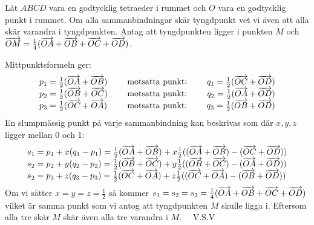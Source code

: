 \begin{task}{2.11}
	Låt $ABCD$ vara en godtycklig tetraeder i rummet och $O$ vara en godtycklig punkt i rummet. 
	Om alla sammanbindningar skär tyngdpunkt vet vi även att alla skär varandra i tyngdpunkten.
	Antag att tyngdpunkten ligger i punkten $M$ och $\overrightarrow{OM}=\frac{1}{4}(\overrightarrow{OA}+\overrightarrow{OB}+\overrightarrow{OC}+\overrightarrow{OD})$.

	Mittpunktsformeln ger:
	\[\begin{array}{lcr}
	p_1=\frac{1}{2}(\overrightarrow{OA}+\overrightarrow{OB}) & \text{~~~~motsatta punkt:~~~~} & q_1=\frac{1}{2}(\overrightarrow{OC}+\overrightarrow{OD}) \\
	p_2=\frac{1}{2}(\overrightarrow{OB}+\overrightarrow{OC}) & \text{~~~~motsatta punkt:~~~~} & q_2=\frac{1}{2}(\overrightarrow{OA}+\overrightarrow{OD}) \\
	p_3=\frac{1}{2}(\overrightarrow{OC}+\overrightarrow{OA}) & \text{~~~~motsatta punkt:~~~~} & q_3=\frac{1}{2}(\overrightarrow{OB}+\overrightarrow{OD})
	\end{array}\]
	En slumpmässig punkt på varje sammanbindning kan beskrivas som där $x,y,z$ ligger mellan 0 och 1:
	\[\begin{array}{l}
	s_1=p_1+x(q_1-p_1)=\frac{1}{2}(\overrightarrow{OA}+\overrightarrow{OB})+x\frac{1}{2}((\overrightarrow{OA}+\overrightarrow{OB})-(\overrightarrow{OC}+\overrightarrow{OD})) \\
	s_2=p_2+y(q_2-p_2)=\frac{1}{2}(\overrightarrow{OB}+\overrightarrow{OC})+y\frac{1}{2}((\overrightarrow{OB}+\overrightarrow{OC})-(\overrightarrow{OA}+\overrightarrow{OD})) \\
	s_2=p_3+z(q_3-p_3)=\frac{1}{2}(\overrightarrow{OC}+\overrightarrow{OA})+z\frac{1}{2}((\overrightarrow{OC}+\overrightarrow{OA})-(\overrightarrow{OB}+\overrightarrow{OD}))
	\end{array}\]
	Om vi sätter $x=y=z=\frac{1}{2}$ så kommer $s_1=s_2=s_3=\frac{1}{4}(\overrightarrow{OA}+\overrightarrow{OB}+\overrightarrow{OC}+\overrightarrow{OD})$ vilket är samma punkt som vi antog att tyngdpunkten $M$ skulle ligga i. Eftersom alla tre skär $M$ skär även alla tre varandra i $M$. ~~V.S.V
\end{task}

